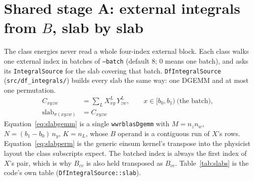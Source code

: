 \documentclass[11pt]{article}
\newcommand{\code}[1]{\texttt{#1}}
\begin{document}
\section{\texorpdfstring{Shared stage A: external integrals from $B$, slab by slab}{Shared stage A: external integrals from B, slab by slab}}
\label{sec:df}

The class energies never read a whole four-index external block. Each class
walks one external index in batches of \code{--batch} (default 8; 0 means one
batch), and asks its \code{IntegralSource} for the slab covering that batch.
\code{DfIntegralSource} (\code{src/df\_integrals/}) builds every slab the same
way: one DGEMM and at most one permutation.
\begin{align}
  C_{xyzw} &= \sum_L X^L_{xy}\,Y^L_{zw},
    \qquad x \in [b_0, b_1)\ \text{(the batch)},
  \label{eq:slabgemm}\\
  \mathrm{slab}_{\sigma(xyzw)} &= C_{xyzw}
  \label{eq:slabperm}
\end{align}
Equation~\eqref{eq:slabgemm} is a single \code{wwrblasDgemm} with $M = n_z
n_w$, $N = (b_1-b_0)\,n_y$, $K = n_L$, whose $B$ operand is a contiguous run
of $X$'s rows. Equation~\eqref{eq:slabperm} is the generic einsum kernel's
transpose into the physicist layout the class subscripts expect. The batched
index is always the first index of $X$'s pair, which is why $B_{cv}$ is also
held transposed as $B_{vc}$. Table~\ref{tab:slabs} is the code's own table
(\code{DfIntegralSource::slab}).
\end{document}
